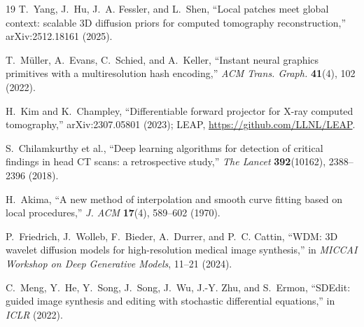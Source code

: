 \documentclass[11pt]{article}
\begin{document}
\begin{thebibliography}{19}
 T.~Yang, J.~Hu, J.~A. Fessler, and L.~Shen, ``Local patches meet global
context: scalable 3D diffusion priors for computed tomography reconstruction,''
arXiv:2512.18161 (2025).

 T.~M\"uller, A.~Evans, C.~Schied, and A.~Keller, ``Instant neural
graphics primitives with a multiresolution hash encoding,'' \emph{ACM Trans. Graph.}
\textbf{41}(4), 102 (2022).

 H.~Kim and K.~Champley, ``Differentiable forward projector for X-ray
computed tomography,'' arXiv:2307.05801 (2023); LEAP,
\url{https://github.com/LLNL/LEAP}.

 S.~Chilamkurthy et al., ``Deep learning algorithms for detection of critical
findings in head CT scans: a retrospective study,'' \emph{The Lancet} \textbf{392}(10162),
2388--2396 (2018).

 H.~Akima, ``A new method of interpolation and smooth curve fitting based on
local procedures,'' \emph{J. ACM} \textbf{17}(4), 589--602 (1970).

 P.~Friedrich, J.~Wolleb, F.~Bieder, A.~Durrer, and P.~C. Cattin, ``WDM: 3D
wavelet diffusion models for high-resolution medical image synthesis,'' in \emph{MICCAI
Workshop on Deep Generative Models}, 11--21 (2024).

 C.~Meng, Y.~He, Y.~Song, J.~Song, J.~Wu, J.-Y. Zhu, and S.~Ermon,
``SDEdit: guided image synthesis and editing with stochastic differential equations,'' in
\emph{ICLR} (2022).

\end{thebibliography}
\end{document}
